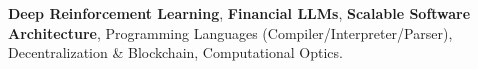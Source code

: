 \textbf{Deep Reinforcement Learning}, \textbf{Financial LLMs}, \textbf{Scalable Software Architecture}, Programming Languages (Compiler/Interpreter/Parser), Decentralization \& Blockchain, Computational Optics.
